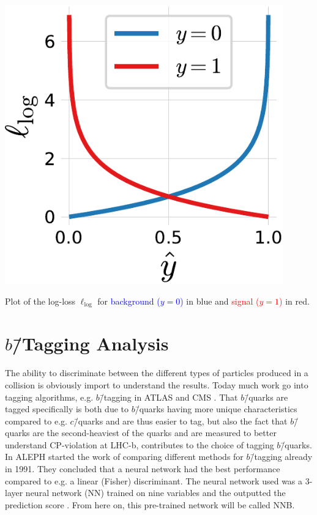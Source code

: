 \begin{marginfigure}[-5cm]
  \includegraphics[draft=false, width=0.9\textwidth]{figures/log_loss_cross_entropy/logloss.pdf}
  \caption[Plot of the Log-Loss $\ell_\mathrm{log}$]
          {Plot of the log-loss $\ell_\mathrm{log}$ for \textcolor{blue}{background ($y=0$)} in blue and \textcolor{red}{signal ($y=1$)} in red.} 
  \label{fig:q:logloss}
\end{marginfigure}

\FloatBarrier
\section[b-Tagging Analysis]{$b$\=/Tagging Analysis}
\label{sec:q:b_tagging_analysis}

The ability to discriminate between the different types of particles produced in a collision is obviously import to understand the results. Today much work go into tagging algorithms, e.g. $b$\=/tagging in ATLAS and CMS \autocite{scodellaroTaggingATLASCMS2017}. That $b$\=/quarks are tagged specifically is both due to $b$\=/quarks having more unique characteristics compared to e.g. $c$\=/quarks and are thus easier to tag, but also the fact that $b$\=/quarks are the second-heaviest of the quarks and are measured to better understand CP-violation at LHC-b, contributes to the choice of tagging $b$\=/quarks. In ALEPH \citet{proriolTAGGINGQUARKEVENTS1991} started the work of comparing different methods for $b$\=/tagging already in \num{1991}. They concluded that a neural network had the best performance compared to e.g. a linear (Fisher) discriminant. The neural network used was a 3-layer neural network (NN) trained on nine variables and the outputted the prediction score . From here on, this pre-trained network will be called NNB. 


